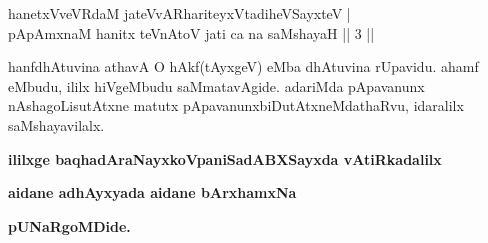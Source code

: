 
\begin{shl}
hanetxVveVRdaM jateVvAR\s hariteyxVtadiheVSayxteV | \\
pApAmxnaM hanitx teVnAtoV jati ca na saMshayaH \hfill ||  3 || 
\end{shl}

\begin{artha}
hanfdhAtuvina athavA O hAkf(tAyxgeV) eMba dhAtuvina rUpavidu. ahamf eMbudu, ililx hiVgeMbudu saMmatavAgide. adariMda pApavanunx nAshagoLisutAtxne matutx pApavanunx\break biDutAtxneMdathaRvu, idaralilx saMshayavilalx.
\end{artha}

\begin{center}
{\bf ililxge baqhadAraNayxkoVpaniSadABXSayxda vAtiRkadalilx}
\smallskip

{\bf aidane adhAyxyada aidane bArxhamxNa}
\smallskip

{\bf pUNaRgoMDide.}
\end{center}
